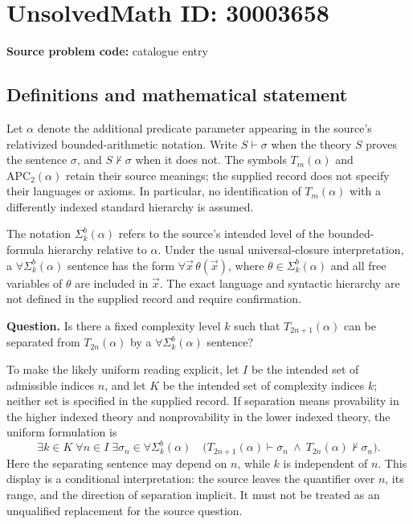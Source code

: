 \documentclass[11pt]{article}
\begin{document}
\section*{UnsolvedMath ID: 30003658}
\textbf{Source problem code:} catalogue entry
\subsection{Definitions and mathematical statement}
Let \(\alpha\) denote the additional predicate parameter appearing in the source's relativized bounded-arithmetic notation. Write \(S\vdash\sigma\) when the theory \(S\) proves the sentence \(\sigma\), and \(S\nvdash\sigma\) when it does not. The symbols \(T_m(\alpha)\) and \(\mathrm{APC}_2(\alpha)\) retain their source meanings; the supplied record does not specify their languages or axioms. In particular, no identification of \(T_m(\alpha)\) with a differently indexed standard hierarchy is assumed.

The notation \(\Sigma_k^b(\alpha)\) refers to the source's intended level of the bounded-formula hierarchy relative to \(\alpha\). Under the usual universal-closure interpretation, a \(\forall\Sigma_k^b(\alpha)\) sentence has the form \(\forall\vec{x}\,\theta(\vec{x})\), where \(\theta\in\Sigma_k^b(\alpha)\) and all free variables of \(\theta\) are included in \(\vec{x}\). The exact language and syntactic hierarchy are not defined in the supplied record and require confirmation.

\textbf{Question.} Is there a fixed complexity level \(k\) such that \(T_{2n+1}(\alpha)\) can be separated from \(T_{2n}(\alpha)\) by a \(\forall\Sigma_k^b(\alpha)\) sentence?

To make the likely uniform reading explicit, let \(I\) be the intended set of admissible indices \(n\), and let \(K\) be the intended set of complexity indices \(k\); neither set is specified in the supplied record. If separation means provability in the higher indexed theory and nonprovability in the lower indexed theory, the uniform formulation is
\[
\exists k\in K\;\forall n\in I\;\exists\sigma_n\in\forall\Sigma_k^b(\alpha)\quad
\bigl(T_{2n+1}(\alpha)\vdash\sigma_n
\ \land\ T_{2n}(\alpha)\nvdash\sigma_n\bigr).
\]
Here the separating sentence may depend on \(n\), while \(k\) is independent of \(n\). This display is a conditional interpretation: the source leaves the quantifier over \(n\), its range, and the direction of separation implicit. It must not be treated as an unqualified replacement for the source question.
\end{document}

